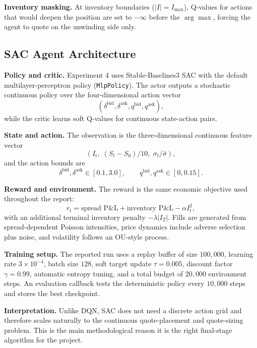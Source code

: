 \documentclass[11pt,a4paper]{article}
\begin{document}
\textbf{Inventory masking.}
At inventory boundaries ($|I| = I_{\max}$), Q-values for actions that would deepen the position are set to $-\infty$ before the $\arg\max$, forcing the agent to quote on the unwinding side only.

\subsection{SAC Agent Architecture}

\textbf{Policy and critic.}
Experiment 4 uses Stable-Baselines3 SAC with the default multilayer-perceptron policy (\texttt{MlpPolicy}). The actor outputs a stochastic continuous policy over the four-dimensional action vector
\[
(\delta^{\mathrm{bid}}, \delta^{\mathrm{ask}}, q^{\mathrm{bid}}, q^{\mathrm{ask}}),
\]
while the critic learns soft Q-values for continuous state-action pairs.

\textbf{State and action.}
The observation is the three-dimensional continuous feature vector
\[
(I_t,\; (S_t - S_0)/10,\; \sigma_t/\bar{\sigma}),
\]
and the action bounds are
\[
\delta^{\mathrm{bid}}, \delta^{\mathrm{ask}} \in [0.1, 3.0], \qquad
q^{\mathrm{bid}}, q^{\mathrm{ask}} \in [0, 0.15].
\]

\textbf{Reward and environment.}
The reward is the same economic objective used throughout the report:
\[
r_t = \text{spread P\&L} + \text{inventory P\&L} - \alpha I_t^2,
\]
with an additional terminal inventory penalty $-\lambda |I_T|$. Fills are generated from spread-dependent Poisson intensities, price dynamics include adverse selection plus noise, and volatility follows an OU-style process.

\textbf{Training setup.}
The reported run uses a replay buffer of size $100{,}000$, learning rate $3 \times 10^{-4}$, batch size $128$, soft target update $\tau = 0.005$, discount factor $\gamma = 0.99$, automatic entropy tuning, and a total budget of $20{,}000$ environment steps. An evaluation callback tests the deterministic policy every $10{,}000$ steps and stores the best checkpoint.

\textbf{Interpretation.}
Unlike DQN, SAC does not need a discrete action grid and therefore scales naturally to the continuous quote-placement and quote-sizing problem. This is the main methodological reason it is the right final-stage algorithm for the project.
\end{document}
